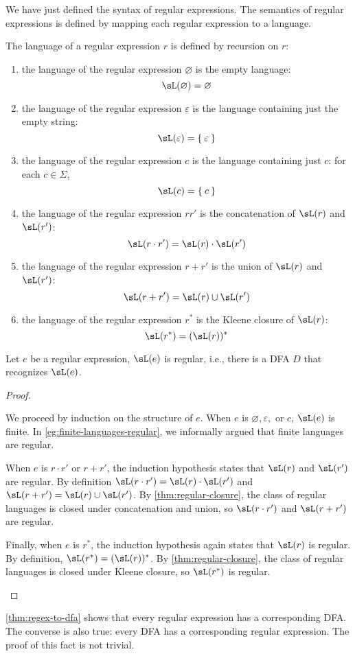 \documentclass{zett}
\begin{document}
\begin{node}
  We have just defined the syntax of regular expressions.
  The semantics of regular expressions is defined by mapping each regular expression to a language.
\end{node}

\begin{defn}
  The language of a regular expression $r$ is defined by recursion on $r$:
  \begin{enumerate}
  \item the language of the regular expression $\varnothing$ is the empty language:
    $$\sL(\varnothing) = \varnothing$$
  \item the language of the regular expression $\varepsilon$ is the language containing just the empty string:
    $$\sL(\varepsilon) = \Set{\varepsilon}$$
  \item the language of the regular expression $c$ is the language containing just $c$: for each $c \in \Sigma$,
    $$\sL(c) = \Set{c}$$
  \item the language of the regular expression $rr'$ is the concatenation of $\sL(r)$ and $\sL(r')$:
    $$\sL(r \cdot r') = \sL(r) \cdot \sL(r')$$
  \item the language of the regular expression $r + r'$ is the union of $\sL(r)$ and $\sL(r')$:
    $$\sL(r + r') = \sL(r) \cup \sL(r')$$
  \item the language of the regular expression $r^{*}$ is the Kleene closure of $\sL(r)$:
    $$\sL(r^{*}) = (\sL(r))^{*}$$
  \end{enumerate}
\end{defn}

\begin{thm}\label{thm:regex-to-dfa}
  Let $e$ be a regular expression, $\sL(e)$ is regular, i.e., there is a DFA $D$ that recognizes $\sL(e)$.
\end{thm}
\begin{proof}
  \begin{node}
    We proceed by induction on the structure of $e$.
    When $e$ is $\varnothing, \varepsilon,$ or $c$, $\sL(e)$ is finite.
    In \cref{eg:finite-languages-regular}, we informally argued that finite languages are regular.
  \end{node}
  \begin{node}
    When $e$ is $r \cdot r'$ or $r + r'$, the induction hypothesis states that $\sL(r)$ and $\sL(r')$ are regular.
    By definition $\sL(r \cdot r') = \sL(r) \cdot \sL(r')$ and $\sL(r + r') = \sL(r) \cup \sL(r')$.
    By \cref{thm:regular-closure}, the class of regular languages is closed under concatenation and union, so $\sL(r \cdot r')$ and $\sL(r + r')$ are regular.
  \end{node}
  \begin{node}
    Finally, when $e$ is $r^{*}$, the induction hypothesis again states that $\sL(r)$ is regular.
    By definition, $\sL(r^{*}) = (\sL(r))^{*}$.
    By \cref{thm:regular-closure}, the class of regular languages is closed under Kleene closure, so $\sL(r^{*})$ is regular.
  \end{node}
\end{proof}

\begin{node}
  \cref{thm:regex-to-dfa} shows that every regular expression has a corresponding DFA.
  The converse is also true: every DFA has a corresponding regular expression.
  The proof of this fact is not trivial.
\end{node}
\end{document}
